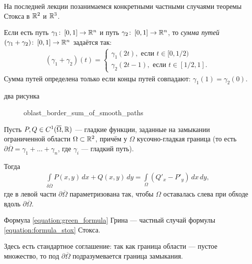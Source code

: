 
На последней лекции позанимаемся конкретными частными случаями теоремы Стокса в $\mathbb{R}^{2}$ и $\mathbb{R}^{3}$.

\begin{df*}
 Если есть путь $\gamma_1 \colon\, [0, 1] \to \mathbb{R}^{n}$ и путь $\gamma_2 \colon\, [0, 1] \to \mathbb{R}^{n}$, то \textit{сумма путей} $(\gamma_1 + \gamma_2) \colon\, [0, 1] \to \mathbb{R}^{n}$ задаётся так:
 \begin{align*}
  (\gamma_1 + \gamma_2)(t) = \begin{cases}
   \gamma_1(2t), \text{ если } t \in [0, 1 / 2) \\
   \gamma_2(2t - 1), \text{ если } t \in [1 / 2, 1 ].
  \end{cases} 
 \end{align*} Сумма путей определена только если концы путей совпадают: $\gamma_1(1) = \gamma_2(0)$.

 {\color{red} два рисунка}
\end{df*}

\begin{figure}[ht]
    \centering
    \caption{oblast_border_sum_of_smooth_paths}
    \label{fig:oblast_border_sum_of_smooth_paths}
\end{figure}

\begin{thm}
\label{theorem:green_formula}
 Пусть $P, Q \in C^{1}(\overline \Omega, \mathbb{R})$ --- гладкие функции, заданные на замыкании ограниченной области $\Omega \subset \mathbb{R}^{2}$, причём у $\Omega$ кусочно-гладкая граница (то есть $\partial \overline \Omega = \gamma_1 + \ldots + \gamma_n$, где $\gamma_i$ --- гладкий путь).

 Тогда
 \begin{align}
  \label{equation:green_formula}
  \int\limits_{\delta \overline \Omega} P(x,y) \, dx + Q(x,y)\, dy  = \int\limits_{\Omega} (Q'_x - P'_y)\,dx\,dy
 ,\end{align} где в левой части $\partial \overline \Omega$ параметризована так, чтобы $\Omega$ оставалась слева при обходе вдоль $\partial \overline \Omega$.
\end{thm}

Формула \eqref{equation:green_formula} Грина --- частный случай формулы \eqref{equation:formula_stox} Стокса.

Здесь есть стандартное соглашение: так как граница области --- пустое множество, то под $\partial \overline \Omega$ подразумевается граница замыкания.

